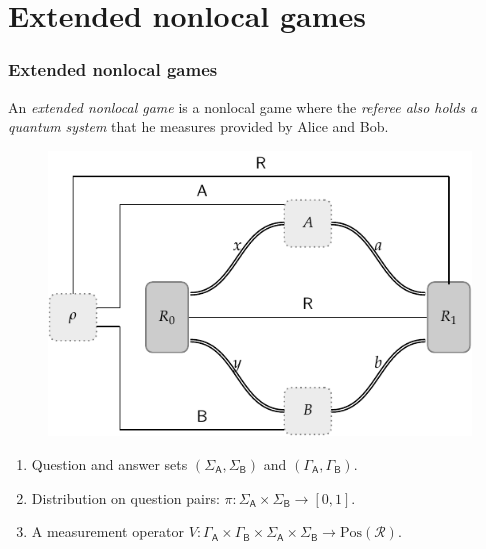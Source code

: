 \documentclass{beamer}
\def\R{\mathcal{R}}
\def \GammaA{\Gamma_{\reg{A}}}
\def \GammaB{\Gamma_{\reg{B}}}
\def \SigmaA{\Sigma_{\reg{A}}}
\def \SigmaB{\Sigma_{\reg{B}}}
\newcommand{\setft}[1]{\mathrm{#1}}
\newcommand{\Pos}{\setft{Pos}}
\newcommand{\reg}[1]{\mathsf{#1}}
\begin{document}
  \section{Extended nonlocal games}


\begin{frame}
	\frametitle{Extended nonlocal games}
	An \emph{extended nonlocal game} is a nonlocal game where the \emph{referee also holds a quantum system} that he measures provided by Alice and Bob. 
	\begin{figure}[!htpb] \label{fig:extended-nonlocal-game}
	\begin{center}
		\includegraphics[scale=0.7]{figures/enlg_2.pdf}
	\end{center}
\end{figure}
	\begin{enumerate}
		\item Question and answer sets $(\SigmaA,\SigmaB)$ and $(\GammaA,\GammaB)$. \vspace{1mm}		
		\item Distribution on question pairs: $\pi: \SigmaA \times \SigmaB \rightarrow [0,1]$.\vspace{1mm}
		\item A measurement operator $V: \GammaA \times \GammaB \times \SigmaA \times \SigmaB \rightarrow \Pos(\R)$.
	\end{enumerate}
\end{frame}
\end{document}
